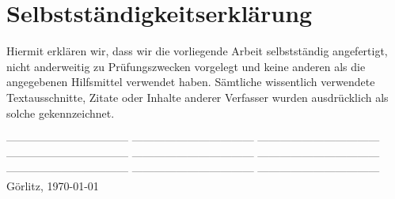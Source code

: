 \documentclass[
    11pt,               %
    a4paper,            %
    headsepline,        %
    foodsepline,        %
    cleardoubleplain,   %
    liststotoc,         %
    bibtotoc,           %
]%
{scrartcl}
\begin{document}
\pagestyle{empty}


\tableofcontents
\thispagestyle{empty}

\newpage
\pagestyle{empty}
\listoffigures

\newpage
\listoftables

\newpage
\pagestyle{plain}
\setcounter{section}{0}








\renewcommand{\baselinestretch}{1.13}\normalsize
{}
\renewcommand{\bibname}{BIBLIOGRAPHY}


\cleardoublepage

\section*{Selbstständigkeitserklärung}
\thispagestyle{empty} Hiermit erklären wir, dass wir die vorliegende
Arbeit selbstständig angefertigt, nicht anderweitig zu
Prüfungszwecken vorgelegt und keine anderen als die angegebenen
Hilfsmittel verwendet haben. Sämtliche wissentlich verwendete
Textausschnitte, Zitate oder Inhalte anderer Verfasser
wurden ausdrücklich als solche gekennzeichnet.%

\vspace{2cm}\noindent
\vspace{1cm}\noindent
--------------------------------- \newline
\vspace{1cm}\noindent
--------------------------------- \newline
\vspace{1cm}\noindent
--------------------------------- \newline
\vspace{1cm}\noindent
--------------------------------- \newline
\vspace{1cm}\noindent
--------------------------------- \newline
\vspace{1cm}\noindent
--------------------------------- \newline
\vspace{1cm}\noindent
--------------------------------- \newline
\vspace{1cm}\noindent
--------------------------------- \newline
\vspace{1cm}\noindent
--------------------------------- \newline
Görlitz, \today
\end{document}
